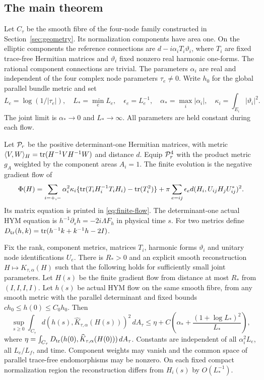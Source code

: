 \subsection{The main theorem}
Let $C_\tau$ be the smooth fibre of the four-node family constructed
in Section~\ref{sec:geometry}. Its normalization components have
area one. On the elliptic components the reference connections are
$d-i\alpha_iT_i\vartheta_i$, where $T_i$ are fixed trace-free
Hermitian matrices and $\vartheta_i$ fixed nonzero real harmonic
one-forms. The rational component connections are trivial.
The parameters $\alpha_i$ are real and independent of the four
complex node parameters $\tau_e\ne0$. Write $h_0$ for the
global parallel bundle metric and set
\[
 L_e=\log(1/|\tau_e|),\quad L_*=\min_eL_e,\quad
 \epsilon_e=L_e^{-1},\quad
 \alpha_*=\max_i|\alpha_i|,\quad
 \kappa_i=\int_{E_i}|\vartheta_i|^2.
\]
The joint limit is $\alpha_*\to0$ and $L_*\to\infty$.
All parameters are held constant during each flow.

Let $\mathcal P_r$ be the positive determinant-one Hermitian matrices,
with metric $\langle V,W\rangle_H=\operatorname{tr}(H^{-1}VH^{-1}W)$
and distance $d$. Equip $\mathcal P_r^4$ with the product metric
$g_A$ weighted by the component areas $A_i=1$.
The finite evolution is the negative gradient flow of
\begin{equation}\label{eq:intro-potential}
 \Phi(H)=
 \sum_{i=+,-}\alpha_i^2\kappa_i
   \{\operatorname{tr}(T_iH_i^{-1}T_iH_i)-\operatorname{tr}(T_i^2)\}
 +\pi\sum_{e=ij}\epsilon_e d(H_i,U_{ij}H_jU_{ij}^*)^2.
\end{equation}
Its matrix equation is printed in \eqref{eq:finite-flow}.
The determinant-one actual HYM equation is
$h^{-1}\partial_sh=-2i\Lambda F_h$ in physical time $s$.
For two metrics define
$D_{\operatorname{tr}}(h,k)=\operatorname{tr}(h^{-1}k+k^{-1}h-2I)$.

\begin{theorem}\label{thm:intro}
Fix the rank, component metrics, matrices $T_i$, harmonic forms
$\vartheta_i$ and unitary node identifications $U_e$. There
is $R_*>0$ and an explicit smooth reconstruction
$H\mapsto\widehat K_{\tau,\alpha}(H)$ such that the following
holds for sufficiently small joint parameters.
Let $H(s)$ be the finite gradient flow from distance at most
$R_*$ from $(I,I,I,I)$. Let $h(s)$ be actual HYM flow on
the same smooth fibre, from any smooth metric with the parallel
determinant and fixed bounds $ch_0\le h(0)\le C_0h_0$.
Then
\begin{equation}\label{eq:intro-main}
 \sup_{s\ge0}\int_{C_\tau}
     d(h(s),\widehat K_{\tau,\alpha}(H(s)))^2\,dA_\tau
 \le\eta+C\left(\alpha_*+
                   \frac{(1+\log L_*)^2}{L_*}\right),
\end{equation}
where
$\eta=\int_{C_\tau}D_{\operatorname{tr}}(h(0),\widehat K_{\tau,\alpha}(H(0)))\,dA_\tau$.
Constants are independent of all $\alpha_i^2L_e$,
all $L_e/L_f$, and time. Component weights may vanish and
the common space of parallel trace-free endomorphisms may
be nonzero. On each fixed compact normalization region the
reconstruction differs from $H_i(s)$ by $O(L_*^{-1})$.
\end{theorem}


